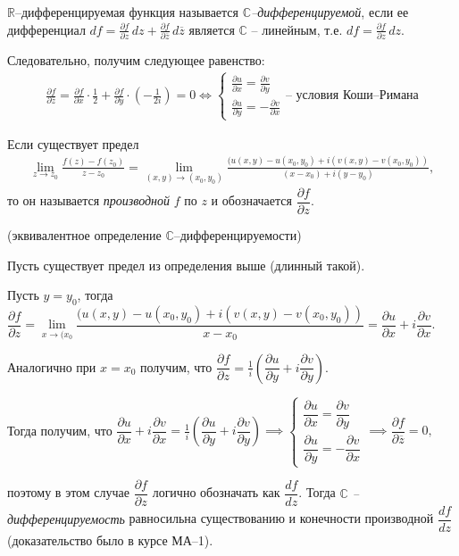 \begin{definition*}
	$\mathbb{R}$--дифференцируемая функция называется \textit{$\mathbb{C}$--дифференцируемой}, если ее дифференциал $df =  \frac{\partial f}{\partial z}\, dz +  \frac{\partial f}{\partial \overline{z}}\, d\overline{z}$ является $\mathbb{C}$ -- линейным, т.е. $df =  \frac{\partial f}{\partial z}\, dz$. 
	
	Следовательно, получим следующее равенство:
	\begin{align*}
		\frac{\partial f}{\partial \overline{z}} =  \frac{\partial f}{\partial x} \cdot \frac 12 + \frac{\partial f}{\partial y} \cdot \left( -\frac{1}{2i} \right)  = 0 \iff 
		\begin{cases}
		\frac{\partial u}{\partial x} = \frac{\partial v}{\partial y}  \\
		\frac{\partial u}{\partial y} = -\frac{\partial v}{\partial x} 
		\end{cases} \text{-- условия Коши--Римана}
	\end{align*}
\end{definition*}

\begin{definition*}	
	Если существует предел
	\begin{align*}
	 \lim\limits_{z \to z_0} \frac{f(z) - f(z_0)}{z - z_0} = \lim\limits_{(x, y) \to( x_0, y_0)} \frac{(u(x,y) - u(x_0, y_0) + i(v(x,y) - v(x_0, y_0))}{(x - x_0) + i (y - y_0)},
	\end{align*}
	то он называется \textit{производной} $f$ по $z$ и обозначается $\dfrac{\partial f}{\partial z}$.
\end{definition*}

\begin{definition*} 
	(эквивалентное определение $\mathbb{C}$--дифференцируемости) 
	
	Пусть существует предел из определения выше (длинный такой). 
	
	Пусть $y = y_0$, тогда $\dfrac{\partial f}{\partial z} =\lim\limits_{x\to( x_0} \dfrac{(u(x,y) - u(x_0, y_0) + i(v(x,y) - v(x_0, y_0))}{x - x_0}  = \dfrac{\partial u}{\partial x} + i \dfrac{\partial v}{\partial x} $.
	
	Аналогично при $x = x_0$ получим, что $\dfrac{\partial f}{\partial z} = \frac 1i \left( \dfrac{\partial u}{\partial y} + i \dfrac{\partial v}{\partial y}\right)$. 
	
	Тогда получим, что $\dfrac{\partial u}{\partial x} + i \dfrac{\partial v}{\partial x} =\frac 1i \left( \dfrac{\partial u}{\partial y} + i \dfrac{\partial v}{\partial y}\right) \implies
	\begin{cases}
	\dfrac{\partial u}{\partial x} = \dfrac{\partial v}{\partial y} \\
	\dfrac{\partial u}{\partial y} =-\dfrac{\partial v}{\partial x} 
	\end{cases} \implies
	\dfrac{\partial f}{\partial \overline{z}}  = 0,
	$ 
	
	поэтому в этом случае $\dfrac{\partial f}{\partial z}$ логично обозначать как $\dfrac{df}{dz}$. Тогда\textit{ $\mathbb{C}$ -- дифференцируемость} равносильна существованию и конечности производной $\dfrac{df}{dz}$ (доказательство было в курсе МА--1).
\end{definition*}

